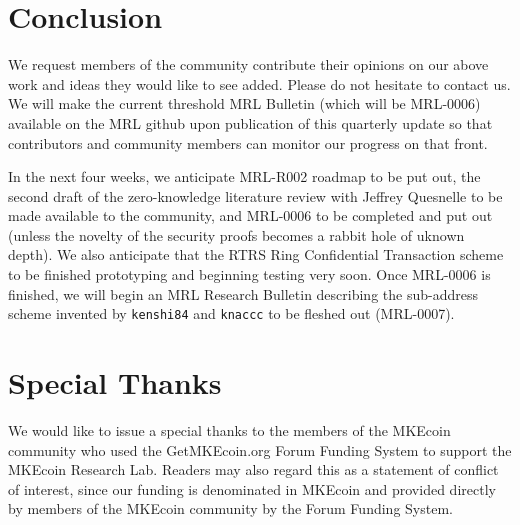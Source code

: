 \documentclass[12pt,english]{mrl}
\theoremstyle{definition}
\numberwithin{equation}{section}
\numberwithin{figure}{section}
\numberwithin{equation}{section}
\numberwithin{equation}{section}
\numberwithin{figure}{section}
\begin{document}
\section{Conclusion}

We request members of the community contribute their opinions on our above work and ideas they would like to see added. Please do not hesitate to contact us.  We will make the current threshold MRL Bulletin (which will be MRL-0006) available on the MRL github upon publication of this quarterly update so that contributors and community members can monitor our progress on that front. 

In the next four weeks, we anticipate MRL-R002 roadmap to be put out, the second draft of the zero-knowledge literature review with Jeffrey Quesnelle to be made available to the community, and MRL-0006 to be completed and put out (unless the novelty of the security proofs becomes a rabbit hole of uknown depth). We also anticipate that the RTRS Ring Confidential Transaction scheme to be finished prototyping and beginning testing very soon. Once MRL-0006 is finished, we will begin an MRL Research Bulletin describing the sub-address scheme invented by \texttt{kenshi84} and \texttt{knaccc} to be fleshed out (MRL-0007).




\section{Special Thanks} 

We would like to issue a special thanks to the members of the MKEcoin community who used the GetMKEcoin.org Forum Funding System to support the MKEcoin Research Lab. Readers may also regard this as a statement of conflict of interest, since our funding is denominated in MKEcoin and provided directly by members of the MKEcoin community by the Forum Funding System.

\medskip{}



\end{document}
